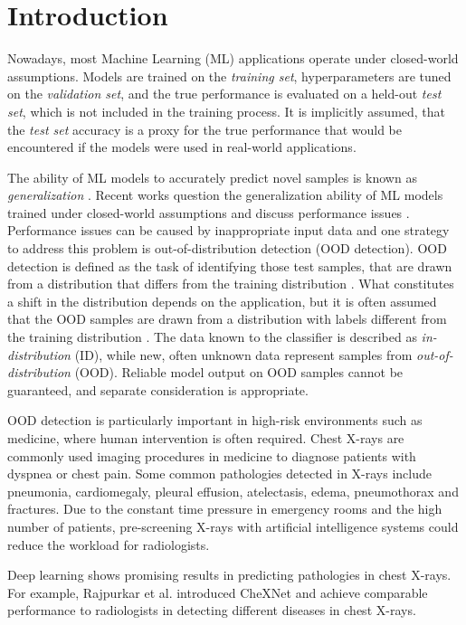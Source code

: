 \section{Introduction}
\raggedbottom
Nowadays, most Machine Learning (ML) applications operate under closed-world assumptions.
Models are trained on the \textit{training set}, hyperparameters are tuned on the \textit{validation set}, and the true performance is evaluated on a held-out \textit{test set}, which is not included in the training process.
It is implicitly assumed, that the \textit{test set} accuracy is a proxy for the true performance that would be encountered if the models were used in real-world applications.
\par
The ability of ML models to accurately predict novel samples is known as \textit{generalization} \citep{Bishop2006}.
Recent works question the generalization ability of ML models trained under closed-world assumptions and discuss performance issues \citep{Recht2018,Zech2018}.
Performance issues can be caused by inappropriate input data and one strategy to address this problem is out-of-distribution detection (OOD detection).
OOD detection is defined as the task of identifying those test samples, that are drawn from a distribution that differs from the training distribution \citep{Yang2021}.
What constitutes a shift in the distribution depends on the application, but it is often assumed that the OOD samples are drawn from a distribution with labels different from the training distribution \citep{Yang2021}.
The data known to the classifier is described as \textit{in-distribution} (ID), while new, often unknown data represent samples from \textit{out-of-distribution} (OOD).
Reliable model output on OOD samples cannot be guaranteed, and separate consideration is appropriate.
\par
OOD detection is particularly important in high-risk environments such as medicine, where human intervention is often required.
Chest X-rays are commonly used imaging procedures in medicine to diagnose patients with dyspnea or chest pain.
Some common pathologies detected in X-rays include pneumonia, cardiomegaly, pleural effusion, atelectasis, edema, pneumothorax and fractures.
Due to the constant time pressure in emergency rooms and the high number of patients, pre-screening X-rays with artificial intelligence systems could reduce the workload for radiologists. 
\par
Deep learning shows promising results in predicting pathologies in chest X-rays.
For example, Rajpurkar et al. \citep{Rajpurkar2017} introduced CheXNet and achieve comparable performance to radiologists in detecting different diseases in chest X-rays.
